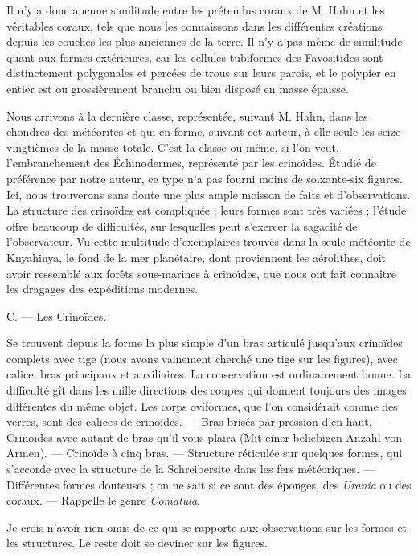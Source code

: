 \documentclass[a4paper, 12pt, oneside, french]{article}
\begin{document}
Il n'y a donc aucune similitude entre les prétendus coraux de M. Hahn et les véritables coraux, tels que nous les connaissons dans les différentes créations depuis les couches les plus anciennes de la terre. Il n'y a pas même de similitude quant aux formes extérieures, car les cellules tubiformes des Favositides sont distinctement polygonales et percées de trous sur leurs parois, et le polypier en entier est ou grossièrement branchu ou bien disposé en masse épaisse.

Nous arrivons à la dernière classe, représentée, suivant M. Hahn, dans les chondres des météorites et qui en forme, suivant cet auteur, à elle seule les seize vingtièmes de la masse totale. C'est la classe ou même, si l'on veut, l'embranchement des Échinodermes, représenté par les crinoïdes. Étudié de préférence par notre auteur, ce type n'a pas fourni moins de soixante-six figures. Ici, nous trouverons sans doute une plus ample moisson de faits et d'observations. La structure des crinoïdes est compliquée ; leurs formes sont très variées ; l'étude offre beaucoup de difficultés, sur lesquelles peut s'exercer la sagacité de l'observateur. Vu cette multitude d'exemplaires trouvés dans la seule météorite de Knyahinya, le fond de la mer planétaire, dont proviennent les aérolithes, doit avoir ressemblé aux forêts sous-marines à crinoïdes, que nous ont fait connaître les dragages des expéditions modernes.

\og C. --- Les Crinoïdes. \fg

\og Se trouvent depuis la forme la plus simple d'un bras articulé jusqu'aux crinoïdes complets avec tige (nous avons vainement cherché une tige sur les figures), avec calice, bras principaux et auxiliaires. La conservation est ordinairement bonne. La difficulté gît dans les mille directions des coupes qui donnent toujours des images différentes du même objet. Les corps oviformes, que l'on considérait comme des verres, sont des calices de crinoïdes. \fg --- \og Bras brisés par pression d'en haut. \fg --- \og Crinoïdes avec autant de bras qu'il vous plaira \fg (Mit einer beliebigen Anzahl von Armen). --- \og Crinoïde à cinq bras. \fg --- \og Structure réticulée sur quelques formes, qui s'accorde avec la structure de la Schreibersite dans les fers météoriques. \fg --- \og Différentes formes douteuses ; on ne sait si ce sont des éponges, des \emph{Urania} ou des coraux. \fg --- \og Rappelle le genre \emph{Comatula}. \fg

Je crois n'avoir rien omis de ce qui se rapporte aux observations sur les formes et les structures. Le reste doit se deviner sur les figures.
\end{document}
